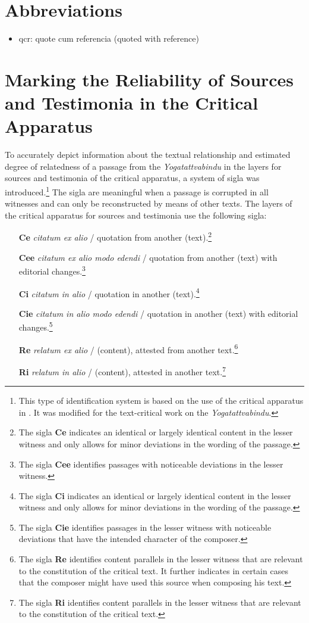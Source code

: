 \section{Abbreviations}
\begin{itemize}
  \item qcr: quote cum referencia (quoted with reference)
  \end{itemize}

\section{Marking the Reliability of Sources and Testimonia in the Critical Apparatus}
\label{kennz}

To accurately depict information about the textual relationship and estimated degree of relatedness of a passage from the \textit{Yogatattvabindu} in the layers for sources and testimonia of the critical apparatus, a system of sigla was introduced.\footnote{This type of identification system is based on the use of the critical apparatus in \parencite[lii-liii]{steinkellner2005}. It was modified for the text-critical work on the \textit{Yogatattvabindu}.} The sigla are meaningful when a passage is corrupted in all witnesses and can only be reconstructed by means of other texts. The layers of the critical apparatus for sources and testimonia use the following sigla:

\begin{enumerate}
\item[\textbf{Ce}] \textit{citatum ex alio} / quotation from another (text).\footnote{The sigla \textbf{Ce} indicates an identical or largely identical content in the lesser witness and only allows for minor deviations in the wording of the passage.}
\item[\textbf{Cee}] \textit{citatum ex alio modo edendi} / quotation from another (text) with editorial changes.\footnote{The sigla \textbf{Cee} identifies passages with noticeable deviations in the lesser witness.}
\item[\textbf{Ci}] \textit{citatum in alio} / quotation in another (text).\footnote{The sigla \textbf{Ci} indicates an identical or largely identical content in the lesser witness and only allows for minor deviations in the wording of the passage.}
\item[\textbf{Cie}] \textit{citatum in alio modo edendi} / quotation in another (text) with editorial changes.\footnote{The sigla \textbf{Cie} identifies passages in the lesser witness with noticeable deviations that have the intended character of the composer.}
\item[\textbf{Re}] \textit{relatum ex alio} / (content), attested from another text.\footnote{The sigla \textbf{Re} identifies content parallels in the lesser witness that are relevant to the constitution of the critical text. It further indicates in certain cases that the composer might have used this source when composing his text.}
\item[\textbf{Ri}] \textit{relatum in alio} / (content), attested in another text.\footnote{The sigla \textbf{Ri} identifies content parallels in the lesser witness that are relevant to the constitution of the critical text.}
\end{enumerate}

